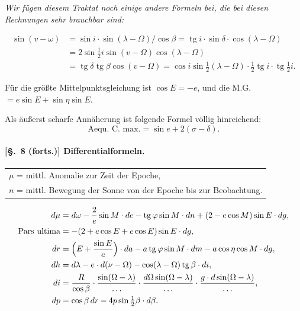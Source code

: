 \documentclass[12pt,a4paper]{article}
\DeclareMathOperator{\tg}{tg}
\theoremstyle{plain}
\theoremstyle{definition}
\theoremstyle{remark}
\begin{document}
\medskip

\textit{Wir fügen diesem Traktat noch einige andere Formeln bei, die bei diesen Rechnungen sehr brauchbar sind:}

\begin{align*}
\sin(v - \omega) &= \sin i \cdot \sin(\lambda - \Omega) / \cos\beta = \tg i \cdot \sin\delta \cdot \cos(\lambda - \Omega) \\
&= 2\sin\tfrac{1}{2}i \sin(v - \Omega) \cos(\lambda - \Omega) \\
&= \tg\delta \tg\beta \cos(v - \Omega) = \cos i \sin\tfrac{1}{2}(\lambda - \Omega) \cdot \tfrac{1}{2} \tg i \cdot \tg\tfrac{1}{2}i.
\end{align*}

Für die größte Mittelpunktsgleichung ist $\cos E = -e$, und die M.G. $= e \sin E + \sin\eta \sin E$.

Als äußerst scharfe Annäherung ist folgende Formel völlig hinreichend:
\[
\text{Aequ. C. max.} = \sin e + 2(\sigma - \delta).
\]

\newpage

\paragraph{[§.~8 (forts.)] Differentialformeln.}

\begin{center}
\begin{tabular}{l}
$\mu$ = mittl. Anomalie zur Zeit der Epoche, \\
$n$ = mittl. Bewegung der Sonne von der Epoche bis zur Beobachtung.
\end{tabular}
\end{center}

\begin{align*}
d\mu &= d\omega - \frac{2}{e} \sin M \cdot de - \tg\varphi \sin M \cdot dn + (2 - e \cos M) \sin E \cdot dg, \\
\text{Pars ultima} &= -(2 + e \cos E + e \cos E) \sin E \cdot dg, \\
dr &= \Bigl(E + \frac{\sin E}{e}\Bigr) \cdot da - a \tg\varphi \sin M \cdot dm - a \cos\eta \cos M \cdot dg, \\
dh &= d\lambda - e \cdot d(\nu - \Omega) - \cos(\lambda - \Omega) \tg\beta \cdot di, \\
di &= \frac{R}{\cos\beta} \cdot \frac{\sin(\Omega - \lambda)}{\dots} \cdot \frac{d\Omega \sin(\Omega - \lambda)}{\dots} \cdot \frac{g \cdot d\sin(\Omega - \lambda)}{\dots}, \\
dp &= \cos\beta \, dr - 4p \sin\tfrac{1}{2}\beta \cdot d\beta.
\end{align*}
\end{document}
